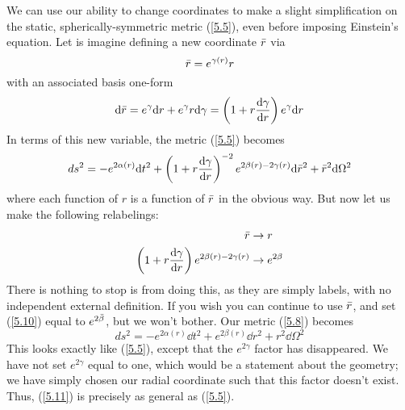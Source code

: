 We can use our ability to change coordinates to make a slight simplification on the static, spherically-symmetric metric (\ref{5.5}), even before imposing Einstein's equation. Let is imagine defining a new coordinate $\Bar{r}$ via
\begin{equation*}
    \Bar{r}=e^{\gamma(r)}r
\end{equation*}
with an associated basis one-form
\begin{equation*}
    \dd\Bar{r}=e^\gamma\dd r+e^\gamma r\dd\gamma=\left(1+r\dv{\gamma}{r}\right)e^\gamma\dd r
\end{equation*}
In terms of this new variable, the metric (\ref{5.5}) becomes
\begin{equation}\label{5.8}
    ds^2=-e^{2\alpha(r)}\dd t^2+\left(1+r\dv{\gamma}{r}\right)^{-2}e^{2\beta(r)-2\gamma(r)}\dd\Bar{r}^2+\Bar{r}^2\dd\Omega^2
\end{equation}
where each function of $r$ is a function of $\Bar{r}$ in the obvious way. But now let us make the following relabelings:
\begin{align}
    \label{5.9}\Bar{r}&\to r\\
    \label{5.10}\left(1+r\dv{\gamma}{r}\right)e^{2\beta(r)-2\gamma(r)}&\to e^{2\beta}
\end{align}
There is nothing to stop is from doing this, as they are simply labels, with no independent external definition. If you wish you can continue to use $\Bar{r}$, and set (\ref{5.10}) equal to $e^{2\Bar{\beta}}$, but we won't bother. Our metric (\ref{5.8}) becomes
\begin{equation}\label{5.11}
    ds^2=-e^{2\alpha(r)}\dd t^2+e^{2\beta(r)}\dd r^2+r^2\dd\Omega^2
\end{equation}
This looks exactly like (\ref{5.5}), except that the $e^{2\gamma}$ factor has disappeared. We have not set $e^{2\gamma}$ equal to one, which would be a statement about the geometry; we have simply chosen our radial coordinate such that this factor doesn't exist. Thus, (\ref{5.11}) is precisely as general as (\ref{5.5}).

